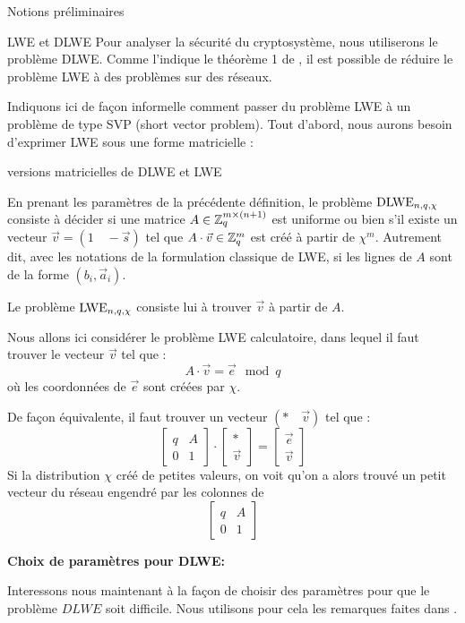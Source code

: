\begin{section}{Notions préliminaires}
\begin{subsection}{LWE et DLWE}
	Pour analyser la sécurité du cryptosystème, nous utiliserons le problème DLWE. Comme l'indique le théorème 1 de \cite{C:GenSahWat13}, il est possible de réduire le problème LWE à des problèmes sur des réseaux.

	Indiquons ici de façon informelle comment passer du problème LWE à un problème de type SVP (short vector problem). Tout d'abord, nous aurons besoin d'exprimer LWE sous une forme matricielle :

	\begin{definition}{versions matricielles de DLWE et LWE}

	En prenant les paramètres de la précédente définition, le problème $\text{DLWE}_{n,q,\chi}$ consiste à décider si une matrice $A \in \mathbb{Z}_q^{m \times (n+1)}$ est uniforme ou bien s'il existe un vecteur $\vec{v} = (1\quad -\vec{s})$ tel que $A \cdot \vec{v} \in \mathbb{Z}_q^{m}$ est créé à partir de $\chi^m$. Autrement dit, avec les notations de la formulation classique de LWE, si les lignes de $A$ sont de la forme $(b_i, \vec{a}_i)$.
	
	Le problème $\text{LWE}_{n,q,\chi}$ consiste lui à trouver $\vec{v}$ à partir de $A$.
	\end{definition}

	Nous allons ici considérer le problème LWE calculatoire, dans lequel il faut trouver le vecteur $\vec{v}$ tel que :
	\[ A\cdot \vec{v} = \vec{e} \mod q \]
	où les coordonnées de $\vec{e}$ sont créées par $\chi$.

	De façon équivalente, il faut trouver un vecteur $(*\quad\vec{v})$ tel que :
	\[ \begin{bmatrix}q & A \\ 0 &1 \end{bmatrix}\cdot
	   \begin{bmatrix}* \\ \vec{v} \end{bmatrix} =
	   \begin{bmatrix} \vec{e} \\ \vec{v} \end{bmatrix} \]
	Si la distribution $\chi$ créé de petites valeurs, on voit qu'on a alors trouvé un \og petit \fg vecteur du réseau engendré par les colonnes de 
	\[ \begin{bmatrix}q & A \\ 0 &1 \end{bmatrix} \]

	\textbf{Choix de paramètres pour DLWE:}

	Interessons nous maintenant à la façon de choisir des paramètres
	pour que le problème $DLWE$ soit difficile. Nous utilisons pour cela 
	les remarques faites dans \cite{halevi}.


\end{subsection}
\end{section}
